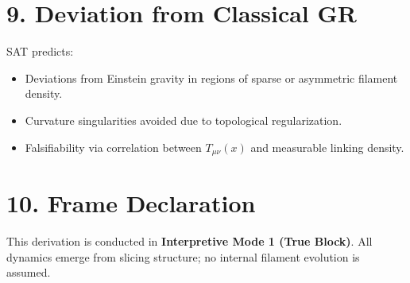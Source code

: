 \documentclass[12pt]{article}
\begin{document}
\section*{9. Deviation from Classical GR}

SAT predicts:
\begin{itemize}
    \item Deviations from Einstein gravity in regions of sparse or asymmetric filament density.
    \item Curvature singularities avoided due to topological regularization.
    \item Falsifiability via correlation between \( T_{\mu\nu}(x) \) and measurable linking density.
\end{itemize}

\section*{10. Frame Declaration}

This derivation is conducted in \textbf{Interpretive Mode 1 (True Block)}. All dynamics emerge from slicing structure; no internal filament evolution is assumed.
\end{document}
